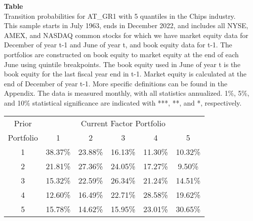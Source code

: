 \begin{table*}[ht!]
\raggedright
{}
\label{tab: transition_probs_AT_GR1_Chips_with_5_quantiles}
\textbf{Table \thetable} \\
Transition probabilities for AT_GR1 with 5 quantiles in the Chips industry. \\
\hspace*{1em}This sample starts in July 1963, ends in December 2022, and includes all NYSE, AMEX, and NASDAQ common stocks for which we have market equity data for December of year t-1 and June of year t, and book equity data for t-1. The portfolios are constructed on book equity to market equity at the end of each June using quintile breakpoints.  The book equity used in June of year t is the book equity for the last fiscal year end in t-1.  Market equity is calculated at the end of December of year t-1.  More specific definitions can be found in the Appendix.  The data is measured monthly, with all statistics annualized.  1\%, 5\%, and 10\% statistical significance are indicated with ***, **, and *, respectively. \\
\vspace{0.5em}
\centering
\begin{adjustbox}{max width=\textwidth}
\begin{tabular}{@{}cccccc@{}}
\toprule
Prior & \multicolumn{5}{c}{Current Factor Portfolio} \\
Portfolio & 1 & 2 & 3 & 4 & 5 \\
\midrule
1 & 38.37\% & 23.88\% & 16.13\% & 11.30\% & 10.32\% \\
2 & 21.81\% & 27.36\% & 24.05\% & 17.27\% & 9.50\% \\
3 & 15.32\% & 22.59\% & 26.34\% & 21.24\% & 14.51\% \\
4 & 12.60\% & 16.49\% & 22.71\% & 28.58\% & 19.62\% \\
5 & 15.78\% & 14.62\% & 15.95\% & 23.01\% & 30.65\% \\
\bottomrule
\end{tabular}
\end{adjustbox}
\end{table*}